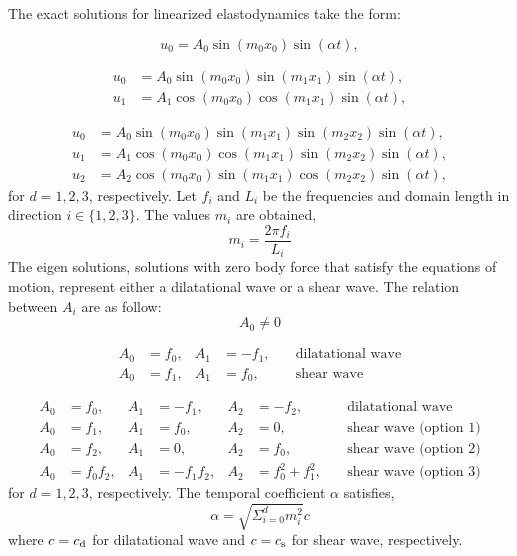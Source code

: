 \documentclass[12pt]{article}
\newcommand{\CS}{c_{\text s}}
\newcommand{\CD}{c_{\text d}}   %
\begin{document}
The exact solutions for linearized elastodynamics take the form:

\begin{equation}
u_0 = A_0 \sin (m_0 x_0) \sin (\alpha t),
\end{equation}

\begin{subequations}
\begin{align}
u_0 &= A_0 \sin (m_0 x_0) \sin (m_1 x_1) \sin (\alpha t), \\
u_1 &= A_1 \cos (m_0 x_0) \cos (m_1 x_1) \sin (\alpha t), 
\end{align}
\end{subequations}

\begin{subequations}
\begin{align}
u_0 &= A_0 \sin (m_0 x_0) \sin (m_1 x_1) \sin (m_2 x_2) \sin (\alpha t), \\
u_1 &= A_1 \cos (m_0 x_0) \cos (m_1 x_1) \sin (m_2 x_2) \sin (\alpha t), \\
u_2 &= A_2 \cos (m_0 x_0) \sin (m_1 x_1) \cos (m_2 x_2) \sin (\alpha t), 
\end{align}
\end{subequations}
%
for $d = 1, 2, 3$, respectively. Let $f_i$ and $L_i$ be the frequencies and domain length in direction $i \in \{1, 2, 3\}$. The values $m_i$ are obtained,
%
\begin{equation}
m_i = \frac{2 \pi f_i}{L_i}
\end{equation}
% 
The eigen solutions, solutions with zero body force that satisfy the equations of motion, represent either a dilatational wave or a shear wave. The relation between $A_i$ are as follow:
%
\begin{equation}
A_0 \neq 0
\end{equation}


\begin{subequations}
\begin{align}
A_0 &= f_0, &A_1 &= -f_1,  \quad &\text{dilatational wave} \\
A_0 &= f_1, &A_1 &= f_0,  \quad &\text{shear wave}
\end{align}
\end{subequations}

\begin{subequations}
\begin{align}
A_0 &= f_0, &A_1 &= -f_1,  &A_2 &= -f_2,  \quad &\text{dilatational wave} \\
A_0 &= f_1, &A_1 &= f_0,  &A_2 &= 0,  \quad &\text{shear wave (option 1)} \\
A_0 &= f_2, &A_1 &= 0,  &A_2 &= f_0,  \quad &\text{shear wave (option 2)} \\
A_0 &= f_0 f_2, &A_1 &= -f_1 f_2,  &A_2 &= f_0^2 + f_1^2,  \quad &\text{shear wave (option 3)}
\end{align}
\end{subequations}
%
for $d = 1, 2, 3$, respectively. The temporal coefficient $\alpha$ satisfies,
%
\begin{equation}
\alpha = \sqrt{\Sigma_{i=0}^d m_i^2} c
\end{equation}
%
where $c = \CD$ for dilatational wave and $c = \CS$ for shear wave, respectively.
\end{document}
